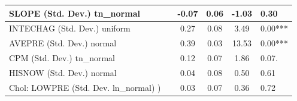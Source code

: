 \begin{table}
\begin{center}
\begin{tabular}{|l|l|c|c|c|l|}
			\hline
			SLOPE (Std. Dev.) tn_normal &  & -0.07 & 0.06 & -1.03 & 0.30 \\
			\hline
			INTECHAG (Std. Dev.) uniform &  & 0.27 & 0.08 & 3.49 & 0.00*** \\
			\hline
			AVEPRE (Std. Dev.) normal &  & 0.39 & 0.03 & 13.53 & 0.00*** \\
			\hline
			CPM (Std. Dev.) tn_normal &  & 0.12 & 0.07 & 1.86 & 0.07. \\
			\hline
			HISNOW (Std. Dev.) normal &  & 0.04 & 0.08 & 0.50 & 0.61 \\
			\hline
			 Chol: LOWPRE (Std. Dev. ln_normal) ) &  & 0.03 & 0.07 & 0.36 & 0.72 \\
			\hline
		\end{tabular}
	\end{center}
\end{table}